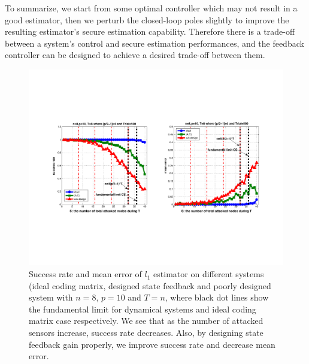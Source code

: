 \documentclass[../../thesis.tex]{subfiles}
\begin{document}
To summarize, we start from some optimal controller which may not result in a good estimator, then we perturb the closed-loop poles slightly to improve the resulting estimator's secure estimation capability. Therefore there is a trade-off between a system's control and secure estimation performances, and the feedback controller can be designed to achieve a desired trade-off between them.
\begin{figure}[!t]
\center
\includegraphics[width=\textwidth]{chapters/se_linear/figures/performance_n8p10.pdf}
\caption{Success rate and mean error of $l_1$ estimator on different systems (ideal coding matrix, designed state feedback and poorly designed system with $n=8$, $p=10$ and $T=n$, where black dot lines show the fundamental limit for dynamical systems and ideal coding matrix case respectively. We see that as the number of attacked sensors increase, success rate decreases. Also, by designing state feedback gain properly, we improve success rate and decrease mean error. }
\label{fig:ex_n8p10}
\end{figure}
\end{document}
